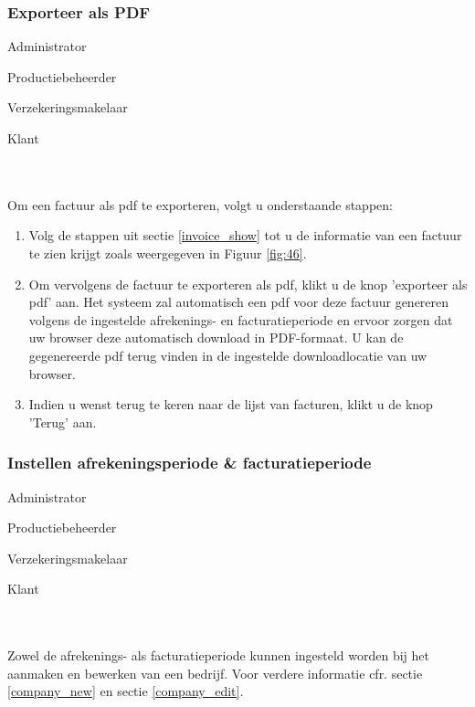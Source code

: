 \documentclass[11pt,openany]{article}
\newcommand{\cmark}{\ding{51}}%
\newcommand{\xmark}{\ding{55}}%
\newcommand{\done}{\rlap{$\square$}{\raisebox{2pt}{\large\hspace{1pt}\cmark}}%
	\hspace{-2.5pt}}
\newcommand{\wontfix}{\rlap{$\square$}{\large\hspace{1pt}\xmark}}
\begin{document}
\subsubsection{Exporteer als PDF}
\begin{todolist}
	\item[\done] Administrator
	\item[\done] Productiebeheerder
	\item[\done] Verzekeringsmakelaar
	\item[\done] Klant 
\end{todolist}
\\
\\
Om een factuur als pdf te exporteren, volgt u onderstaande stappen:
\begin{enumerate}
	\item Volg de stappen uit sectie \ref{invoice_show} tot u de informatie van een factuur te zien krijgt zoals weergegeven in Figuur \ref{fig:46}.
	\item Om vervolgens de factuur te exporteren als pdf, klikt u de knop 'exporteer als pdf' aan.
Het systeem zal automatisch een pdf voor deze factuur genereren volgens de ingestelde afrekenings- en facturatieperiode en ervoor zorgen dat uw browser deze automatisch download in PDF-formaat. U kan de gegenereerde pdf terug vinden in de ingestelde downloadlocatie van uw browser. 
\item Indien u wenst terug te keren naar de lijst van facturen, klikt u de knop 'Terug' aan.
	
\end{enumerate}

\subsubsection{Instellen afrekeningsperiode \& facturatieperiode}
\begin{todolist}
	\item[\done] Administrator
	\item[\done] Productiebeheerder
	\item[\done] Verzekeringsmakelaar
	\item[\wontfix] Klant 
\end{todolist}
\\
\\
Zowel de afrekenings- als facturatieperiode kunnen ingesteld worden bij het aanmaken en bewerken van een bedrijf.
Voor verdere informatie cfr. sectie \ref{company_new} en sectie \ref{company_edit}.
\end{document}
